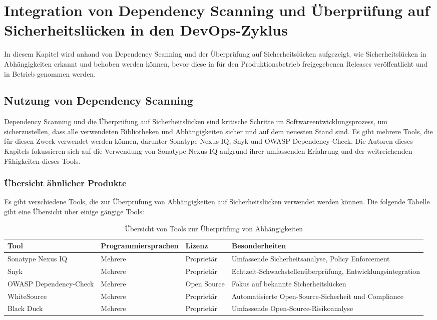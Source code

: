 \section{Integration von Dependency Scanning und Überprüfung auf Sicherheitslücken in den DevOps-Zyklus}
In diesem Kapitel wird anhand von Dependency Scanning und der Überprüfung auf Sicherheitslücken aufgezeigt, wie Sicherheitslücken in Abhängigkeiten erkannt und behoben werden können, bevor diese in für den Produktionsbetrieb freigegebenen Releases veröffentlicht und in Betrieb genommen werden.

\subsection{Nutzung von Dependency Scanning}
Dependency Scanning und die Überprüfung auf Sicherheitslücken sind kritische Schritte im Softwareentwicklungsprozess, um sicherzustellen, dass alle verwendeten Bibliotheken und Abhängigkeiten sicher und auf dem neuesten Stand sind. Es gibt mehrere Tools, die für diesen Zweck verwendet werden können, darunter Sonatype Nexus IQ, Snyk und OWASP Dependency-Check. Die Autoren dieses Kapitels fokussieren sich auf die Verwendung von Sonatype Nexus IQ aufgrund ihrer umfassenden Erfahrung und der weitreichenden Fähigkeiten dieses Tools.

\subsubsection{Übersicht ähnlicher Produkte}

Es gibt verschiedene Tools, die zur Überprüfung von Abhängigkeiten auf Sicherheitslücken verwendet werden können. Die folgende Tabelle gibt eine Übersicht über einige gängige Tools:

\begin{table*}[h!]
\centering
\begin{tabular}{|l|l|l|l|}
\hline
\textbf{Tool} & \textbf{Programmiersprachen} & \textbf{Lizenz} & \textbf{Besonderheiten} \\ \hline
Sonatype Nexus IQ & Mehrere & Proprietär & Umfassende Sicherheitsanalyse, Policy Enforcement \\ \hline
Snyk & Mehrere & Proprietär & Echtzeit-Schwachstellenüberprüfung, Entwicklungsintegration \\ \hline
OWASP Dependency-Check & Mehrere & Open Source & Fokus auf bekannte Sicherheitslücken \\ \hline
WhiteSource & Mehrere & Proprietär & Automatisierte Open-Source-Sicherheit und Compliance \\ \hline
Black Duck & Mehrere & Proprietär & Umfassende Open-Source-Risikoanalyse \\ \hline
\end{tabular}
\caption{Übersicht von Tools zur Überprüfung von Abhängigkeiten}
\label{tab:dependency_scanning_tools}
\end{table*}

